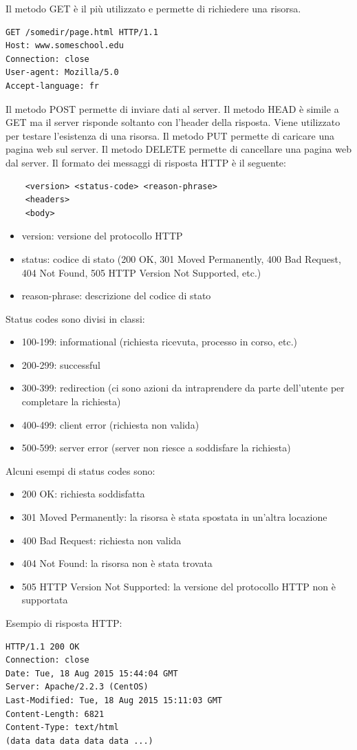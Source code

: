 \documentclass[12pt]{article}
\begin{document}
Il metodo GET è il più utilizzato e permette di richiedere una risorsa.
\begin{verbatim}
GET /somedir/page.html HTTP/1.1
Host: www.someschool.edu
Connection: close
User-agent: Mozilla/5.0
Accept-language: fr
\end{verbatim}
Il metodo POST permette di inviare dati al server.
Il metodo HEAD è simile a GET ma il server risponde soltanto con l'header della risposta. Viene utilizzato per testare l'esistenza di una risorsa.
Il metodo PUT permette di caricare una pagina web sul server.
Il metodo DELETE permette di cancellare una pagina web dal server.
Il formato dei messaggi di risposta HTTP è il seguente:
\begin{verbatim}
    <version> <status-code> <reason-phrase>
    <headers>
    <body>
\end{verbatim}
\begin{itemize}
    \item version: versione del protocollo HTTP
    \item status: codice di stato (200 OK, 301 Moved Permanently, 400 Bad Request, 404 Not Found, 505 HTTP Version Not Supported, etc.)
    \item reason-phrase: descrizione del codice di stato
\end{itemize}
Status codes sono divisi in classi:
\begin{itemize}
    \item 100-199: informational (richiesta ricevuta, processo in corso, etc.)
    \item 200-299: successful
    \item 300-399: redirection (ci sono azioni da intraprendere da parte dell'utente per completare la richiesta)
    \item 400-499: client error (richiesta non valida)
    \item 500-599: server error (server non riesce a soddisfare la richiesta)
\end{itemize}
Alcuni esempi di status codes sono:
\begin{itemize}
    \item 200 OK: richiesta soddisfatta
    \item 301 Moved Permanently: la risorsa è stata spostata in un'altra locazione
    \item 400 Bad Request: richiesta non valida
    \item 404 Not Found: la risorsa non è stata trovata
    \item 505 HTTP Version Not Supported: la versione del protocollo HTTP non è supportata
\end{itemize}
Esempio di risposta HTTP:
\begin{verbatim}
HTTP/1.1 200 OK
Connection: close
Date: Tue, 18 Aug 2015 15:44:04 GMT
Server: Apache/2.2.3 (CentOS)
Last-Modified: Tue, 18 Aug 2015 15:11:03 GMT
Content-Length: 6821
Content-Type: text/html
(data data data data data ...)
\end{verbatim}









    
\end{document}
